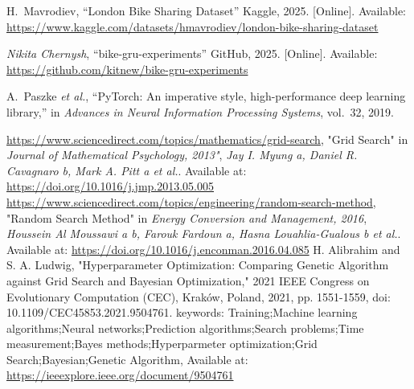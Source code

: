 \documentclass[]{KKUIzaverecnaPraca}
\begin{document}

\begin{thebibliography}{99}

  H.~Mavrodiev, “London Bike Sharing Dataset” Kaggle, 2025. 
  [Online]. Available: \url{https://www.kaggle.com/datasets/hmavrodiev/london-bike-sharing-dataset}

	\textit{Nikita Chernysh}, “bike-gru-experiments” GitHub, 2025. 
	[Online]. Available: \url{https://github.com/kitnew/bike-gru-experiments}

  A.~Paszke \textit{et al.}, “PyTorch: An imperative style, high-performance deep learning library,” 
  in \textit{Advances in Neural Information Processing Systems}, vol.~32, 2019.

	\url{https://www.sciencedirect.com/topics/mathematics/grid-search}, "Grid Search"
	in \textit{Journal of Mathematical Psychology, 2013"}, \textit{Jay I. Myung a, Daniel R. Cavagnaro b, Mark A. Pitt a \textit{et al.}}.
	Available at: \url{https://doi.org/10.1016/j.jmp.2013.05.005}
	\url{https://www.sciencedirect.com/topics/engineering/random-search-method}, "Random Search Method"
	in \textit{Energy Conversion and Management, 2016}, \textit{Houssein Al Moussawi a b, Farouk Fardoun a, Hasna Louahlia-Gualous b \textit{et al.}}.
	Available at: \url{https://doi.org/10.1016/j.enconman.2016.04.085}
	H. Alibrahim and S. A. Ludwig, "Hyperparameter Optimization: Comparing Genetic Algorithm against Grid Search and Bayesian Optimization," 2021 IEEE Congress on Evolutionary Computation (CEC), Kraków, Poland, 2021, pp. 1551-1559, doi: 10.1109/CEC45853.2021.9504761. keywords: {Training;Machine learning algorithms;Neural networks;Prediction algorithms;Search problems;Time measurement;Bayes methods;Hyperparmeter optimization;Grid Search;Bayesian;Genetic Algorithm},
	Available at: \url{https://ieeexplore.ieee.org/document/9504761}
\end{thebibliography}



\end{document}
